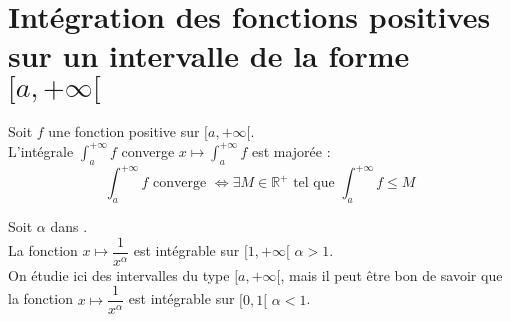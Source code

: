 \documentclass[11pt,a4paper,fleqn,pdftex]{report}
\begin{document}
\section{Intégration des fonctions positives sur un intervalle de la forme $[a,+\infty[$} %
\label{sec:integration_fonction_positives}
\begin{itheorem}
    \label{thm:fonction_positive_integrable}
     Soit $f$ une fonction positive sur $[a,+\infty [$.\\
     L'intégrale $\int_a^{+\infty} f$ converge \ssi{} $x \longmapsto \int_a^{+\infty} f$ est majorée : 
     \begin{equation}
     \int_a^{+\infty} f\text{ converge }\Longleftrightarrow \exists M\in \mathbb{R}^+\text{ tel que }\int_a^{+\infty} f \le M
     \end{equation}
\end{itheorem}
\begin{itheorem}
\label{thm:integrale_riemann}
     Soit $\alpha$ dans \Reel{}.\\
     La fonction $x \longmapsto \dfrac{1}{x^\alpha}$ est intégrable sur $[1,+\infty [$ \ssi{} $\alpha > 1$.\\[1.3\baselineskip] 
     On étudie ici des intervalles du type $[a,+\infty [$, mais il peut être bon de savoir que la fonction $x \longmapsto \dfrac{1}{x^\alpha}$ est intégrable sur $[0,1 [$ \ssi{} $\alpha < 1$.
\end{itheorem}
\end{document}
